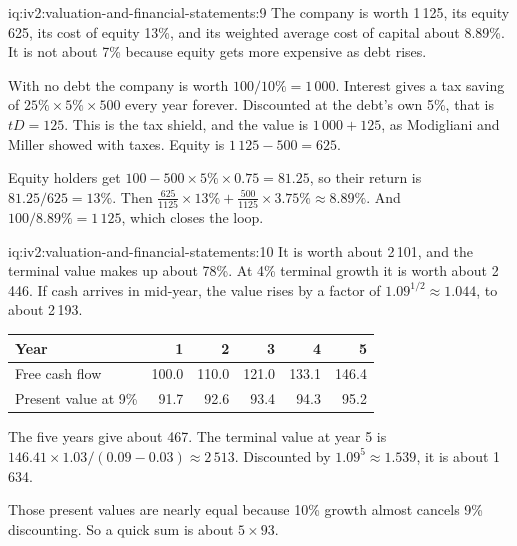 \begin{solution}{iq:iv2:valuation-and-financial-statements:9}
The company is worth 1\,125, its equity 625, its cost of equity 13\%, and its weighted average cost of capital about 8.89\%. It is not about 7\% because equity gets more expensive as debt rises.

With no debt the company is worth $100/10\% = 1\,000$. Interest gives a tax saving of $25\% \times 5\% \times 500$ every year forever. Discounted at the debt's own 5\%, that is $tD = 125$. This is the tax shield, and the value is $1\,000 + 125$, as Modigliani and Miller showed with taxes. Equity is $1\,125 - 500 = 625$.

Equity holders get $100 - 500 \times 5\% \times 0.75 = 81.25$, so their return is $81.25/625 = 13\%$. Then $\tfrac{625}{1125} \times 13\% + \tfrac{500}{1125} \times 3.75\% \approx 8.89\%$. And $100/8.89\% = 1\,125$, which closes the loop.

\end{solution}

\begin{solution}{iq:iv2:valuation-and-financial-statements:10}
It is worth about 2\,101, and the terminal value makes up about 78\%. At 4\% terminal growth it is worth about 2\,446. If cash arrives in mid-year, the value rises by a factor of $1.09^{1/2} \approx 1.044$, to about 2\,193.
\begin{center}\small
\begin{tabular}{@{}lrrrrr@{}}
Year & 1 & 2 & 3 & 4 & 5 \\ \hline
Free cash flow & 100.0 & 110.0 & 121.0 & 133.1 & 146.4 \\
Present value at 9\% & 91.7 & 92.6 & 93.4 & 94.3 & 95.2
\end{tabular}
\end{center}
The five years give about 467. The terminal value at year 5 is $146.41 \times 1.03/(0.09 - 0.03) \approx 2\,513$. Discounted by $1.09^5 \approx 1.539$, it is about 1\,634.

Those present values are nearly equal because 10\% growth almost cancels 9\% discounting. So a quick sum is about $5 \times 93$.

\end{solution}

